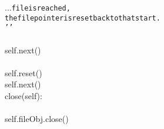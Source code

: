 {{\begin{tabbing}
...{}{\texttt{\hspace{6pt}file\hspace{6pt}is\hspace{6pt}reached,\hspace{6pt}}}\\
{\texttt{\hspace{72pt}the\hspace{6pt}file\hspace{6pt}pointer\hspace{6pt}is\hspace{6pt}reset\hspace{6pt}back\hspace{6pt}to\hspace{6pt}that\hspace{6pt}start.}}\\
{\texttt{\hspace{48pt}{'}}}{\texttt{{'}{'}}}\\
\\
\hspace{6pt}self.next()\\
\\
\hspace{72pt}self.reset()\\
\hspace{6pt}self.next()\\
\hspace{6pt}close(self):\\
\\
\hspace{48pt}self.fileObj.close()
\end{tabbing}}}
